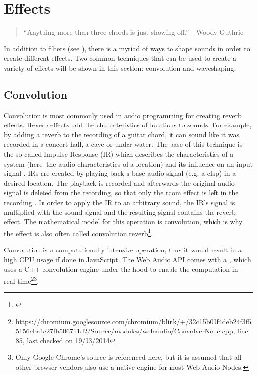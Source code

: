 \section{Effects}
\label{sec:webaudio-effects}

\begin{quote}
  ``Anything more than three chords is just showing off.'' -
  Woody Guthrie
\end{quote}

In addition to filters (see ), there is a myriad of ways to shape sounds in order to create different effects. Two common techniques that can be used to create a variety of effects will be shown in this section: convolution and waveshaping.

\subsection{Convolution}

Convolution is most commonly used in audio programming for creating reverb effects. Reverb effects add the characteristics of locations to sounds. For example, by adding a reverb to the recording of a guitar chord, it can sound like it was recorded in a concert hall, a cave or under water. The base of this technique is the so-called Impulse Response (IR) which describes the characteristics of a system (here: the audio characteristics of a location) and its influence on an input signal \cite[p. 132ff]{park2009introductionto}. IRs are created by playing back a base audio signal (e.g. a clap) in a desired location. The playback is recorded and afterwards the original audio signal is deleted from the recording, so that only the room effect is left in the recording \cite[chapter: Room Effects]{smus2013webaudio}. In order to apply the IR to an arbitrary sound, the IR's signal is multiplied with the sound signal and the resulting signal contains the reverb effect. The mathematical model for this operation is convolution, which is why the effect is also often called convolution reverb\footnote{\cite[p. 139f]{park2009introductionto}}.

Convolution is a computationally intensive operation, thus it would result in a high CPU usage if done in JavaScript. The Web Audio API comes with a  \cite[chapter: ConvolverNode]{wilson2014webaudiospec}, which uses a C++ convolution engine under the hood to enable the computation in real-time\footnote{\url{https://chromium.googlesource.com/chromium/blink/+/32c15b00f4deb24f3f55156eba1c27fb506711d2/Source/modules/webaudio/ConvolverNode.cpp}, line 85, last checked on 19/03/2014}\footnote{Only Google Chrome's source is referenced here, but it is assumed that all other browser vendors also use a native engine for most Web Audio Nodes.}.

